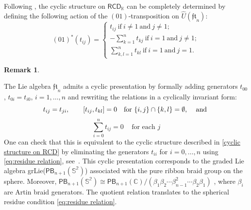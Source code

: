 \documentclass{amsart}
\newcommand{\kk}{\mathbb{K}}    %
\newcommand{\RCD}{\mathsf{RCD}}
\newcommand{\hRCD}{{\RCD}_{\kk}}
\newcommand{\PB}{\mathsf{PB}} %
\theoremstyle{definition}
\newtheorem{remark}[theorem]{Remark}%
\numberwithin{equation}{section}
\begin{document}
Following \cite[Section 3.1]{campos2019configuration}, the cyclic structure on $\hRCD$ can be completely determined by defining the following action of the $(01)$-transposition on $\hat{U}(\mathfrak{ft}_n)$: 
\begin{equation}\label{cyclic structure on RCD}
(01)^*(t_{ij})=\begin{cases} t_{ij} \ \text{if} \ i\not=1 \ \text{and} \ j\not=1;\\ -\sum_{k=1}^n t_{kj} \ \text{if} \ i=1 \ \text{and} \ j\not=1;\\
\sum_{k,l=1}^n t_{kl} \ \text{if} \ i=1 \ \text{and} \ j=1.\end{cases}
\end{equation}

\begin{remark}\label{remark: cyc framed DK}

The Lie algebra $\mathfrak{ft}_n$ admits a cyclic presentation by formally adding generators $t_{00}$, $t_{0i}=t_{i0}$, $i=1,\dots,n$ and rewriting the relations in a cyclically invariant form: 
\begin{equation*}
    t_{ij} = t_{ji}, \qquad [t_{ij}, t_{kl}] = 0 \quad \text{for $\{i,j\}\cap\{k,l\}=\emptyset$, \quad and } 
\end{equation*}
\begin{equation}\label{eq:residue relation}
    \sum_{i=0}^n t_{ij} = 0\, \quad \text{for each $j$} 
\end{equation}
One can check that this is equivalent to the cyclic structure described in \eqref{cyclic structure on RCD} by eliminating the generators $t_{ii}$ for $i=0,\dots, n$ using \eqref{eq:residue relation}, see~\cite[Section 5.1]{willwacher2024cyclic}. This cyclic presentation corresponds to the graded Lie algebra grLie($\PB_{n+1}(\mathbb{S^2})$) associated with the pure ribbon braid group on the sphere. Moreover, $\PB_{n+1}(\mathbb{S^2}) \cong \PB_{n+1}(\mathbb{C})/(\beta_1\beta_2 \cdots \beta^2_{n-1} \cdots \beta_2 \beta_1)$ , where $\beta_i$ are Artin braid generators. The quotient relation translates to the spherical residue condition \eqref{eq:residue relation}. 

\end{remark}
\end{document}
